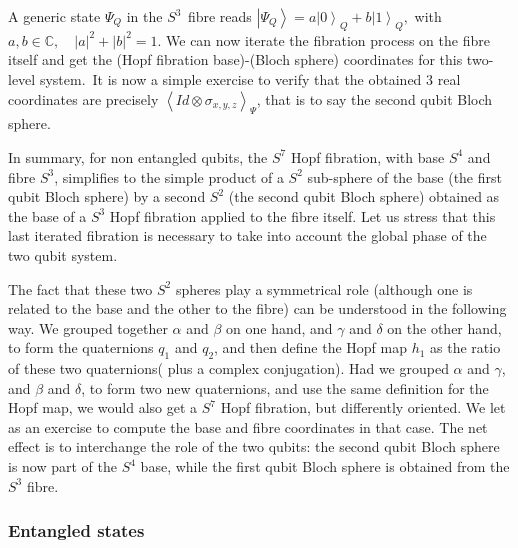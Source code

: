 \documentclass{amsart}
\begin{document}
A generic state $\Psi_{Q}$ in the $S^{3\text{ }}$fibre reads $\left|  \Psi
_{Q}\right\rangle =a\left|  0\right\rangle _{Q}+b\left|  1\right\rangle _{Q},$
with $a,b\in\mathbb{C}\mathbf{,\quad}\left|  a\right|  ^{2}+\left|  b\right|
^{2}=1.$ We can now iterate the fibration process on the fibre itself and get
the (Hopf fibration base)-(Bloch sphere) coordinates for this two-level
system.\ It is now a simple exercise to verify that the obtained 3 real
coordinates are precisely $\left\langle Id\otimes\sigma_{x,y,z}\right\rangle
_{\Psi}$, that is to say the second qubit Bloch sphere.

In summary, for non entangled qubits, the $S^{7}$ Hopf fibration, with base
$S^{4}$ and fibre $S^{3}$, simplifies to the simple product of a $S^{2}$
sub-sphere of the base (the first qubit Bloch sphere) by a second $S^{2}$ (the
second qubit Bloch sphere) obtained as the base of a $S^{3}$ Hopf fibration
applied to the fibre itself. Let us stress that this last iterated fibration
is necessary to take into account the global phase of the two qubit system.

The fact that these two $S^{2}$ spheres play a symmetrical role (although one
is related to the base and the other to the fibre) can be understood in the
following way. We grouped together $\alpha$ and $\beta$ on one hand, and
$\gamma$ and $\delta$ on the other hand, to form the quaternions $q_{1}$ and
$q_{2}$, and then define the Hopf map $h_{1}$ as the ratio of these two
quaternions( plus a complex conjugation). Had we grouped $\alpha$ and $\gamma
$, and $\beta$ and $\delta$, to form two new quaternions, and use the same
definition for the Hopf map, we would also get a $S^{7}$ Hopf fibration, but
differently oriented. We let as an exercise to compute the base and fibre
coordinates in that case. The net effect is to interchange the role of the two
qubits: the second qubit Bloch sphere is now part of the $S^{4}$ base, while
the first qubit Bloch sphere is obtained from the $S^{3}$ fibre.

\subsubsection{Entangled states}
\end{document}
